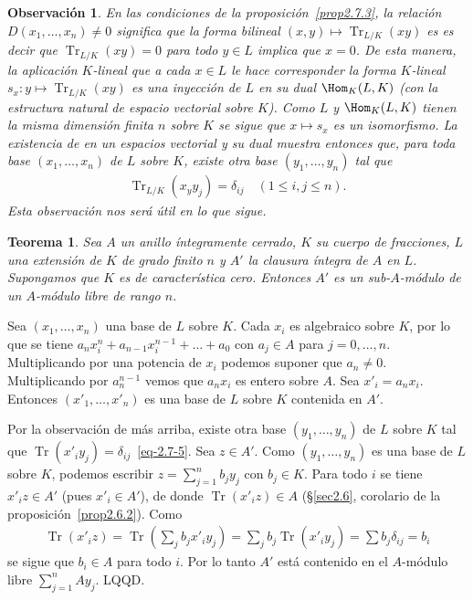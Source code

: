 \documentclass[bibtotoc,leqno,spanish]{amsbook}
\let\emph\relax %
\newcommand{\QED}{LQQD.}
\DeclareMathOperator{\Tr}{Tr}
\numberwithin{equation}{section}
\theoremstyle{note}
\theoremstyle{note}
\newtheorem{theorem}{Teorema}
\theoremstyle{rem}
\newtheorem*{remark*}{Observaci\'on}
\numberwithin{theorem}{section}
\numberwithin{proposition}{section}
\numberwithin{definition}{section}
\numberwithin{lemma}{section}
\numberwithin{corollary}{section}
\numberwithin{example}{section}
\numberwithin{footnote}{section}%
\begin{document}
\begin{remark*}
En las condiciones de la proposici\'on~\ref{prop2.7.3}, la relaci\'on $D(x_{1},\dots,x_{n})\neq 0$ significa que
la forma bilineal $(x,y)\mapsto\Tr_{L/K}(xy)$ es \emph{no degenerada,} es decir que $\Tr_{L/K}(xy) = 0$
para todo $y\in L$ implica que $x = 0$. De esta manera, la aplicaci\'on $K$-lineal que a cada $x\in L$
le hace corresponder la forma $K$-lineal $s_{x}:y\mapsto\Tr_{L/K}(xy)$ es una inyecci\'on de $L$ en su
dual $\Hom_{K}(L,K)$ (con la estructura natural de espacio vectorial sobre $K$). Como $L$ y $\Hom_{K}(L,K)$
tienen la misma dimensi\'on finita $n$ sobre $K$ se sigue que $x\mapsto s_{x}$ es un isomorfismo. La
existencia de \emph{``bases duales''} en un espacios vectorial y su dual muestra entonces que, para toda
base $(x_{1},\dots,x_{n})$ de $L$ sobre $K$, existe otra base $(y_{1},\dots,y_{n})$ tal que
\begin{gather}\label{eq-2.7-5}
\Tr_{L/K}(x_{y}y_{j}) = \delta_{ij}\quad(1\leq i, j\leq n).
\end{gather}
Esta observaci\'on nos ser\'a \'util en lo que sigue.
\end{remark*}

\begin{theorem}\label{teo2.7.1}
Sea $A$ un anillo \'integramente cerrado, $K$ su cuerpo de fracciones, $L$ una extensi\'on de $K$ de grado
finito $n$ y $A'$ la clausura \'integra de $A$ en $L$. Supongamos que $K$ es de caracter\'istica cero.
Entonces $A'$ es un sub-$A$-m\'odulo  de un $A$-m\'odulo libre de rango $n$.
\end{theorem}

Sea $(x_{1},\dots,x_{n})$ una base de $L$ sobre $K$. Cada $x_{i}$ es algebraico sobre $K$, por lo que se tiene
$a_{n}x_{i}^{n}+a_{n-1}x_{i}^{n-1}+\dots+a_{0}$ con $a_{j}\in A$ para $j=0,\dots,n$. Multiplicando por
una potencia de $x_{i}$ podemos suponer que $a_{n}\neq 0$. Multiplicando por $a_{n}^{n-1}$ vemos que $a_{n}x_{i}$
es entero sobre $A$. Sea $x'_{i} = a_{n}x_{i}$. Entonces $(x'_{1},\dots,x'_{n})$ es una base de $L$ sobre $K$
contenida en $A'$.

Por la observaci\'on de m\'as arriba, existe otra base $(y_{1},\dots,y_{n})$ de $L$ sobre $K$ tal que
$\Tr(x'_{i}y_{j}) = \delta_{ij}$~\eqref{eq-2.7-5}. Sea $z\in A'$. Como $(y_{1},\dots,y_{n})$ es una base de $L$
sobre $K$, podemos escribir $z = \sum_{j=1}^{n}b_{j}y_{j}$ con $b_{j}\in K$. Para todo $i$ se tiene
$x'_{i}z\in A'$ (pues $x'_{i}\in A'$), de donde $\Tr(x'_{i}z)\in A$ (\S\ref{sec2.6}, corolario de la
proposici\'on~\ref{prop2.6.2}). Como
\begin{gather*}
\Tr(x'_{i}z) = \Tr\left(\sum_{j}b_{j}x'_{i}y_{j}\right) = \sum_{j}b_{j}\Tr(x'_{i}y_{j}) = \sum b_{j}\delta_{ij} = b_{i}
\end{gather*}
se sigue que $b_{i}\in A$ para todo $i$. Por lo tanto $A'$ est\'a contenido en el $A$-m\'odulo libre
$\sum_{j=1}^{n}Ay_{j}$. \QED
\end{document}
